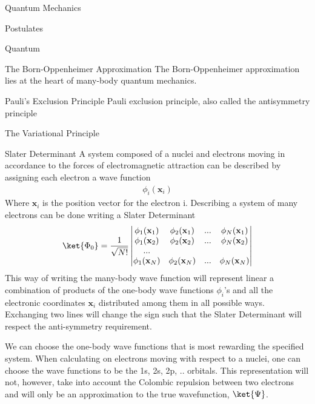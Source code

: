 \documentclass[twoside,english]{uiofysmaster}
\begin{document}
\begin{chapter}{Quantum Mechanics}
 	
	

	\begin{section}{Postulates}

 		Quantum 
 	\end{section}

 	\begin{section}{The Born-Oppenheimer Approximation}
 		The Born-Oppenheimer approximation lies at the heart of many-body quantum mechanics. 
 	\end{section}

 	\begin{section}{Pauli's Exclusion Principle}
 		Pauli exclusion principle, also called the antisymmetry principle \cite{Szabo} 
 	\end{section}

	\begin{section}{The Variational Principle}

	\end{section}

	\begin{section}{Slater Determinant}
		A system composed of a nuclei and electrons moving in accordance to the forces of electromagnetic attraction can be described by assigning each electron
		a wave function 
		\begin{align}
			\phi_i(\mathbf{x}_i)
		\end{align}
		Where $\mathbf{x}_i$ is the position vector for the electron i. Describing a system of many electrons can be done writing a Slater Determinant
		\begin{align}
			\ket{\Phi_0} = \frac{1}{ \sqrt{N!} } \left|\begin{matrix}
				\phi_1(\mathbf{x}_1) & \phi_2(\mathbf{x}_1) & ... & \phi_N(\mathbf{x}_1) \\
				\phi_1(\mathbf{x}_2) & \phi_2(\mathbf{x}_2) & ... & \phi_N(\mathbf{x}_2) \\
				... & & & \\
				\phi_1(\mathbf{x}_N) & \phi_2(\mathbf{x}_N) & ... & \phi_N(\mathbf{x}_N) 
			\end{matrix} \right|
		\end{align}
		This way of writing the many-body wave function will represent linear a combination of products of the one-body wave functions $\phi_i$'s and all the electronic coordinates
		$\mathbf{x}_i$ distributed among them in all possible ways. Exchanging two lines will change the sign such that the Slater Determinant will respect the anti-symmetry 
		requirement. \par
		We can choose the one-body wave functions that is most rewarding the specified system. When calculating on electrons moving with respect to a nuclei, one can choose the wave
		functions to be the 1s, 2s, 2p, .. orbitals. This representation will not, however, take into account the Colombic repulsion between two electrons and will only be an 
		approximation to the true wavefunction, $\ket{\Psi}$.
	\end{section}


\end{chapter}
\end{document}
